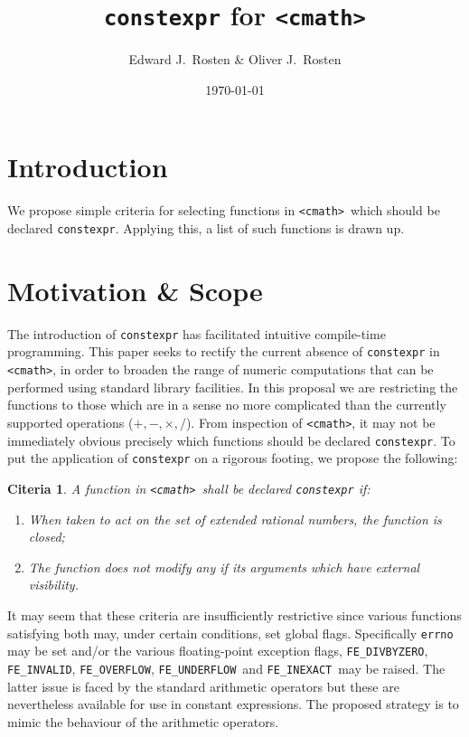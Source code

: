 \documentclass[prd,preprint,amsmath,amssymb,nofootinbib,eqsecnum]{revtex4-1}
\newcommand{\constexpr}{\code{constexpr}\xspace}
\newcommand{\code}[1]{{\tt #1}}
\newcommand{\header}[1]{{\tt <#1>}}
\newcommand{\cmath}{\header{cmath}}
\newcommand{\FEINVALID}{{\tt FE\_INVALID}}
\newcommand{\FEDIVBYZERO}{{\tt FE\_DIVBYZERO}}
\newcommand{\FEINEXACT}{{\tt FE\_INEXACT}}
\newcommand{\FEUNDERFLOW}{{\tt FE\_UNDERFLOW}}
\newcommand{\FEOVERFLOW}{{\tt FE\_OVERFLOW}}
\newcommand{\Operators}{\ensuremath{+,-,\times,/}}
\newtheorem{criteria}{Citeria}
\begin{document}
\title{\constexpr for \cmath}
\author{Edward J.~Rosten \& Oliver J.~Rosten}
\date{\today}
\maketitle

\section{Introduction}

We propose simple criteria for selecting functions in \cmath\ which should be
declared \constexpr. Applying this, a list of such functions is drawn up.

\section{Motivation \& Scope}

The introduction of \constexpr has facilitated intuitive compile-time
programming. This paper seeks to rectify the current absence of \constexpr in
\cmath, in order to broaden the range of numeric computations that can be
performed using standard library facilities. In this proposal we are restricting
the functions to those which are in a sense no more complicated than the
currently supported operations (\Operators).
From inspection of \cmath, it may
not be immediately obvious precisely which functions should be declared
\constexpr. To put the application of \constexpr on a rigorous footing, we
propose the following:
\begin{criteria}
	A function in \cmath\ shall be declared \constexpr if:
	\begin{enumerate}
		\item When taken to act on the set of extended rational numbers, the function is closed;
		
		\item The function does not modify any if its arguments which have external visibility.
	\end{enumerate}
\label{cri:rational}	
\end{criteria}

It may seem that these criteria are insufficiently restrictive since various
functions satisfying both may, under certain conditions, set global flags.
Specifically \code{errno} may be set and/or the various floating-point
exception flags, \FEDIVBYZERO, \FEINVALID, \FEOVERFLOW, \FEUNDERFLOW\ and
\FEINEXACT\ may be raised. The latter issue is 
faced by the standard
arithmetic operators but these are nevertheless available for use in constant
expressions. The proposed strategy is to mimic the behaviour of the arithmetic
operators.
\end{document}
